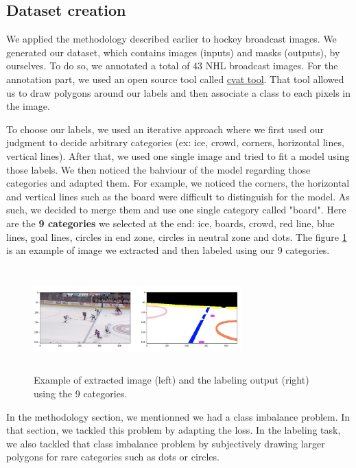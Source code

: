 \subsection{Dataset creation}
We applied the methodology described earlier to hockey broadcast images. We generated our dataset, which contains images (inputs) and masks (outputs), by ourselves. To do so, we annotated a total of 43 NHL broadcast images. For the annotation part, we used an open source tool called \href{https://github.com/opencv/cvat}{cvat tool}. That tool allowed us to draw polygons around our labels and then associate a class to each pixels in the image.

To choose our labels, we used an iterative approach where we first used our judgment to decide arbitrary categories (ex: ice, crowd, corners, horizontal lines, vertical lines). After that, we used one single image and tried to fit a model using those labels. We then noticed the bahviour of the model regarding those categories and adapted them. For example, we noticed the corners, the horizontal and vertical lines such as the board were difficult to distinguish for the model. As such, we decided to merge them and use one single category called "board". Here are the \textbf{9 categories} we selected at the end: ice, boards, crowd, red line, blue lines, goal lines, circles in end zone, circles in neutral zone and dots. The figure \ref{fig:labeling} is an example of image we extracted and then labeled using our 9 categories.

\begin{figure}[H]
	\centering
	\includegraphics[width=8cm, height=4cm]{figures/labeling-example.png}
	\caption{Example of extracted image (left) and the labeling output (right) using the 9 categories.}
	\label{fig:labeling}
\end{figure}

In the methodology section, we mentionned we had a class imbalance problem. In that section, we tackled this problem by adapting the loss. In the labeling task, we also tackled that class imbalance problem by subjectively drawing larger polygons for rare categories such as dots or circles.

